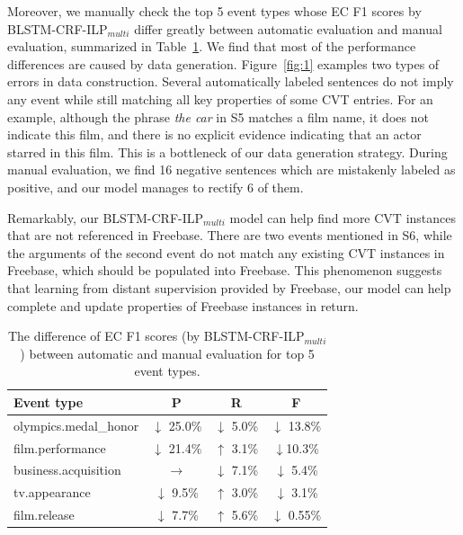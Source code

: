 Moreover, %
 we manually check the top 5 event types whose EC F1 scores by BLSTM-CRF-ILP$_{multi}$ differ greatly between automatic evaluation and manual evaluation, summarized in Table~\ref{tab:4}. We find that most of the performance differences are caused by data generation. Figure~\ref{fig:1} examples two types of errors in data construction. Several automatically labeled sentences do not imply any event while still matching all key properties of some CVT entries. For an example, although the phrase \emph{the car} in S5 matches a film name, it does not indicate this film, and there is no explicit evidence indicating that an actor starred in this film. This is a bottleneck of our data generation strategy. During manual evaluation, we find 16 negative sentences which are mistakenly labeled as positive, and our model manages to rectify 6 of them.

Remarkably, our BLSTM-CRF-ILP$_{multi}$ model can help find more CVT instances that are not referenced in Freebase. There are two events mentioned in S6, while the arguments of the second event do not match any existing CVT instances in Freebase, which should be populated into Freebase. %
This phenomenon suggests that learning from distant supervision provided by Freebase, our model can help complete and update properties of Freebase instances in return.

\begin{table}[h]
\small
\centering
\begin{tabular}{|l|c|c|c|} \hline
	Event type & P & R & F \\ \hline
	olympics.medal\_honor%
	& $\downarrow$ 25.0\% & $\downarrow$ 5.0\% & $\downarrow$ 13.8\% \\ \hline
	film.performance & $\downarrow$ 21.4\% & $\uparrow$ 3.1\% & $\downarrow$10.3\% \\ \hline
	business.acquisition & $\rightarrow$ & $\downarrow$ 7.1\% & $\downarrow$ 5.4\% \\ \hline
	tv.appearance%
	& $\downarrow$ 9.5\% & $\uparrow$ 3.0\% & $\downarrow$ 3.1\% \\ \hline
	film.release%
	& $\downarrow$ 7.7\% & $\uparrow$ 5.6\% & $\downarrow$ 0.55\% \\ \hline
\end{tabular}
\caption{The difference of EC F1 scores (by BLSTM-CRF-ILP$_{multi}$) between automatic and manual evaluation for top 5 event types.\label{tab:4}}
\end{table}

